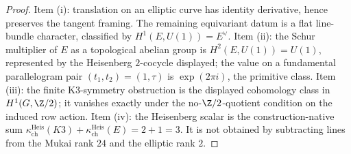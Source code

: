 \begin{proof}
Item (i): translation on an elliptic curve has identity derivative, hence
preserves the tangent framing.  The remaining equivariant datum is a flat
line-bundle character, classified by \(H^1(E,U(1))=E^\vee\).  Item (ii):
the Schur multiplier of \(E\) as a topological abelian group is
\(H^2(E,U(1))=U(1)\), represented by the Heisenberg \(2\)-cocycle
displayed; the value on a fundamental parallelogram pair
\((t_1,t_2)=(1,\tau)\) is \(\exp(2\pi i)\), the primitive class.
Item (iii): the finite K3-symmetry obstruction is the displayed
cohomology class in \(H^1(G,\Z/2)\); it vanishes exactly under the
no-\(\Z/2\)-quotient condition on the induced row action.  Item (iv):
the Heisenberg scalar is the construction-native sum
\(\kappa_{\mathrm{ch}}^{\mathrm{Heis}}(K3)+
\kappa_{\mathrm{ch}}^{\mathrm{Heis}}(E)=2+1=3\).  It is not obtained by
subtracting lines from the Mukai rank \(24\) and the elliptic rank \(2\).
\end{proof}

